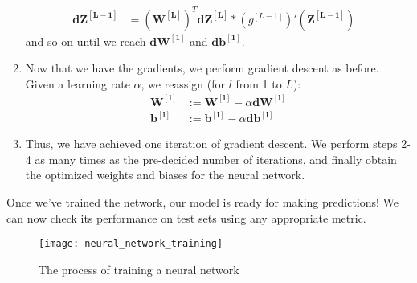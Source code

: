 \documentclass[a4paper, 12pt]{report}
\begin{document}
\begin{enumerate}
\begin{align*}
\bm{dZ^{\left[L-1\right]}} &= \left(\bm{W^{\left[L\right]}}\right)^T\bm{dZ^{\left[L\right]}} * \left(g^{[L-1]}\right)'\left(\bm{Z^{\left[L-1\right]}}\right) &
\end{align*}
and so on until we reach $\bm{dW^{\left[1\right]}}$ and $\bm{db^{\left[1\right]}}$.
\item Now that we have the gradients, we perform gradient descent as before. Given a learning rate $\alpha$, we reassign (for $l$ from 1 to $L$):
\begin{align*}
\bm{W^{\left[l\right]}} &:= \bm{W^{\left[l\right]}} - \alpha\bm{dW^{\left[l\right]}} \\
\bm{b^{\left[l\right]}} &:= \bm{b^{\left[l\right]}} - \alpha\bm{db^{\left[l\right]}}
\end{align*}
\item Thus, we have achieved one iteration of gradient descent. We perform steps 2-4 as many times as the pre-decided number of iterations, and finally obtain the optimized weights and biases for the neural network.
\end{enumerate}
Once we've trained the network, our model is ready for making predictions! We can now check its performance on test sets using any appropriate metric.
\begin{figure}[H]
\centering
\texttt{[image: neural\_network\_training]}
\caption{The process of training a neural network}
\end{figure}
\newpage
\end{document}
